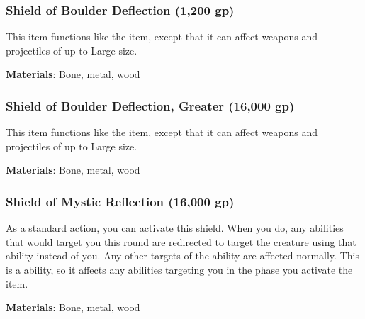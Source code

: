 \lowercase{\hypertarget{item:Shield of Boulder Deflection}{}}\label{item:Shield of Boulder Deflection}
\hypertarget{item:Shield of Boulder Deflection}{\subsubsection{Shield of Boulder Deflection\hfill{} (1,200 gp)}}

This item functions like the  item, except that it can affect weapons and projectiles of up to Large size.



\vspace{0.25em}
\textbf{Materials}: Bone, metal, wood


\lowercase{\hypertarget{item:Shield of Boulder Deflection, Greater}{}}\label{item:Shield of Boulder Deflection, Greater}
\hypertarget{item:Shield of Boulder Deflection, Greater}{\subsubsection{Shield of Boulder Deflection, Greater\hfill{} (16,000 gp)}}

This item functions like the  item, except that it can affect weapons and projectiles of up to Large size.



\vspace{0.25em}
\textbf{Materials}: Bone, metal, wood


\lowercase{\hypertarget{item:Shield of Mystic Reflection}{}}\label{item:Shield of Mystic Reflection}
\hypertarget{item:Shield of Mystic Reflection}{\subsubsection{Shield of Mystic Reflection\hfill{} (16,000 gp)}}

As a standard action, you can activate this shield.
When you do, any   abilities that would target you this round are redirected to target the creature using that ability instead of you.
Any other targets of the ability are affected normally.
This is a  ability, so it affects any abilities targeting you in the phase you activate the item.



\vspace{0.25em}
\textbf{Materials}: Bone, metal, wood


